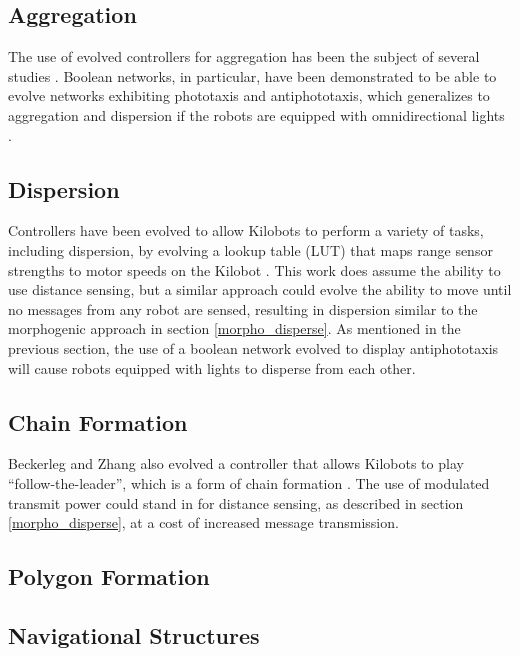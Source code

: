 \documentclass[]{article}
\begin{document}
\subsection{Aggregation}

The use of evolved controllers for aggregation has been the subject of several studies \cite{dorigo2004evolving,bahgecci2005evolving}. 
Boolean networks, in particular, have been demonstrated to be able to evolve networks exhibiting phototaxis and antiphototaxis, which generalizes to aggregation and dispersion if the robots are equipped with omnidirectional lights \cite{roli2011design}.

\subsection{Dispersion}

Controllers have been evolved to allow Kilobots to perform a variety of tasks, including dispersion, by evolving a lookup table (LUT) that maps range sensor strengths to motor speeds on the Kilobot \cite{beckerleg2016evolving}.
This work does assume the ability to use distance sensing, but a similar approach could evolve the ability to move until no messages from any robot are sensed, resulting in dispersion similar to the morphogenic approach in section \ref{morpho_disperse}. 
As mentioned in the previous section, the use of a boolean network evolved to display antiphototaxis will cause robots equipped with lights to disperse from each other. 

\subsection{Chain Formation}

Beckerleg and Zhang also evolved a controller that allows Kilobots to play ``follow-the-leader'', which is a form of chain formation \cite{beckerleg2016evolving}. 
The use of modulated transmit power could stand in for distance sensing, as described in section \ref{morpho_disperse}, at a cost of increased message transmission. 

\subsection{Polygon Formation}

\subsection{Navigational Structures}
\end{document}
